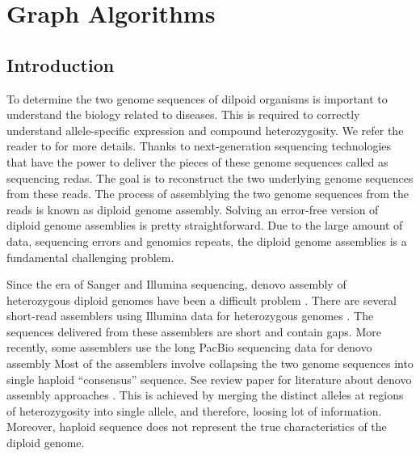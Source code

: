 \chapter{Graph Algorithms}

\section{Introduction}
To determine the two genome sequences of dilpoid organisms is important to understand the biology related to diseases.
This is required to correctly understand allele-specific expression and compound heterozygosity. 
We refer the reader to \citep{tewhey2011importance, glusman2014whole} for more details. 
Thanks to next-generation sequencing technologies that have the power to deliver the pieces of these genome sequences called as sequencing redas.
The goal is to reconstruct the two underlying genome sequences from these reads. 
The process of assemblying the two genome sequences from the reads is known as diploid genome assembly.
Solving an error-free version of diploid genome assemblies is pretty straightforward.
Due to the large amount of data, sequencing errors and genomics repeats, the diploid genome assemblies is a fundamental challenging problem.

Since the era of Sanger and Illumina sequencing, denovo assembly of heterozygous diploid genomes have been a difficult problem \cite{vinson2005assembly}.
There are several short-read assemblers using Illumina data for heterozygous genomes \cite{kajitani2014efficient, pryszcz2016redundans, safonova2015dipspades, bankevich2012spades}.
The sequences delivered from these assemblers are short and contain gaps. 
More recently, some assemblers \cite{koren2017canu, vaser2017fast, xiao2016mecat, berlin2015assembling, chin2013nonhybrid, hunt2015circlator, lin2016assembly} use the long PacBio sequencing data for denovo assembly 
Most of the assemblers involve collapsing the two genome sequences into single haploid ``consensus'' sequence. See review paper for literature about denovo assembly approaches \citep{sovic2013approaches, myers1995toward, myers2005fragment, nagarajan2009parametric}.
This is achieved by merging the distinct alleles at regions of heterozygosity into single allele, and therefore, loosing lot of information.
Moreover, haploid sequence does not represent the true characteristics of the diploid genome. 

